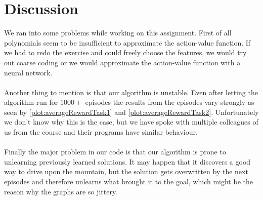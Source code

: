 \documentclass{article}
\begin{document}
	\section{Discussion}
	We ran into some problems while working on this assignment. First of all polynomials seem to be insufficient to approximate the action-value function. If we had to redo the exercise and could freely choose the features, we would try out coarse coding or we would approximate the action-value function with a neural network. \\
	\\
	Another thing to mention is that our algorithm is unstable. Even after letting the algorithm run for $1000+$ episodes the results from the episodes vary strongly as seen by \autoref{plot:averageRewardTask1} and \autoref{plot:averageRewardTask2}. Unfortunately we don't know why this is the case, but we have spoke with multiple colleagues of us from the course and their programs have similar behaviour. \\
	\\
	Finally the major problem in our code is that our algorithm is prone to unlearning previously learned solutions. It may happen that it discovers a good way to drive upon the mountain, but the solution gets overwritten by the next episodes and therefore unlearns what brought it to the goal, which might be the reason why the graphs are so jittery. 
	
	
	
	
\end{document}

